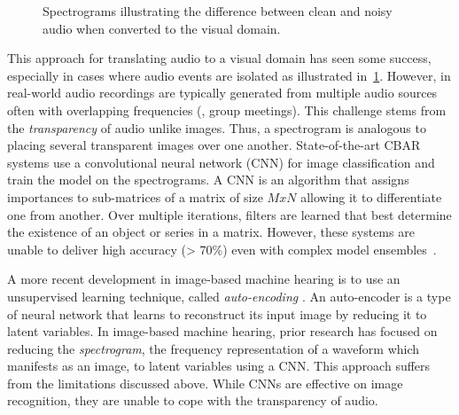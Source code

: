 \begin{figure}[!tbp]
    \centering
    \hfill
    \caption{Spectrograms illustrating the difference between clean and noisy audio when converted to the visual domain.}
    \label{fig:noisy-audio-cmpr}
\end{figure}

This approach for translating audio to a visual domain has seen some success,
especially in cases where audio events are isolated as illustrated
in~\cref{fig:noisy-audio-cmpr}.
However, in real-world audio recordings are typically generated from multiple
audio sources often with overlapping frequencies (\eg, group meetings).
This challenge stems from the \textit{transparency} of audio unlike images. 
Thus, a spectrogram is analogous to placing several transparent images 
over one another. 
State-of-the-art CBAR systems use a convolutional neural network (CNN) for 
image classification \cite{hershey_cnn_2017, roma-content-based-2010} and
train the model on the spectrograms.
A CNN is an algorithm that assigns importances to sub-matrices of a matrix of size $MxN$ allowing it to differentiate one 
from another. Over multiple iterations, filters are learned that best determine the existence of an object or series in a matrix.
However, these systems are unable to deliver high accuracy (> 70\%) even with
complex model ensembles~\cite{xu-large-scale-2018,piczak-environmental-2015}.

A more recent development in image-based machine hearing is to use an
unsupervised learning technique, called \textit{auto-encoding} \cite{Meyer2017}. 
An auto-encoder is a type of neural network that learns to reconstruct its 
input image by reducing it to latent variables.
In image-based machine hearing, prior research has focused on reducing the 
\textit{spectrogram}, the frequency representation of a waveform which manifests as an image,
to latent variables using a CNN.
This approach suffers from the limitations discussed above.
While CNNs are effective on image recognition, they are unable to cope with the
transparency of audio.

